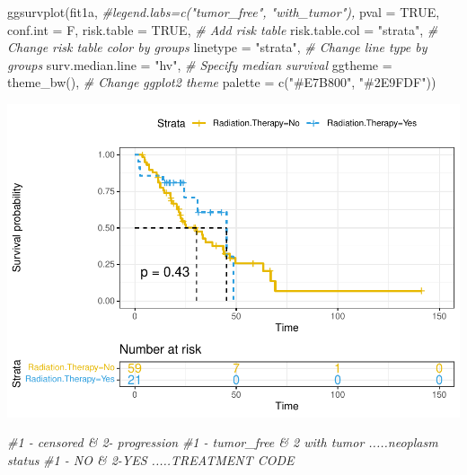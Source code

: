 \documentclass[
  11pt,
]{article}
\newenvironment{Shaded}{\begin{snugshade}}{\end{snugshade}}
\newcommand{\AttributeTok}[1]{\textcolor[rgb]{0.77,0.63,0.00}{#1}}
\newcommand{\CommentTok}[1]{\textcolor[rgb]{0.56,0.35,0.01}{\textit{#1}}}
\newcommand{\ConstantTok}[1]{\textcolor[rgb]{0.00,0.00,0.00}{#1}}
\newcommand{\FunctionTok}[1]{\textcolor[rgb]{0.00,0.00,0.00}{#1}}
\newcommand{\NormalTok}[1]{#1}
\newcommand{\StringTok}[1]{\textcolor[rgb]{0.31,0.60,0.02}{#1}}
\begin{document}
\begin{Shaded}
\begin{Highlighting}[]
\FunctionTok{ggsurvplot}\NormalTok{(fit1a,}
          \CommentTok{\#legend.labs=c("tumor\_free", "with\_tumor"),}
          \AttributeTok{pval =} \ConstantTok{TRUE}\NormalTok{, }\AttributeTok{conf.int =}\NormalTok{ F,}
          \AttributeTok{risk.table =} \ConstantTok{TRUE}\NormalTok{, }\CommentTok{\# Add risk table}
          \AttributeTok{risk.table.col =} \StringTok{"strata"}\NormalTok{, }\CommentTok{\# Change risk table color by groups}
          \AttributeTok{linetype =} \StringTok{"strata"}\NormalTok{, }\CommentTok{\# Change line type by groups}
          \AttributeTok{surv.median.line =} \StringTok{"hv"}\NormalTok{, }\CommentTok{\# Specify median survival}
          \AttributeTok{ggtheme =} \FunctionTok{theme\_bw}\NormalTok{(), }\CommentTok{\# Change ggplot2 theme}
          \AttributeTok{palette =} \FunctionTok{c}\NormalTok{(}\StringTok{"\#E7B800"}\NormalTok{, }\StringTok{"\#2E9FDF"}\NormalTok{))}
\end{Highlighting}
\end{Shaded}

\includegraphics{new_surv_2_files/figure-latex/unnamed-chunk-6-1.pdf}

\begin{Shaded}
\begin{Highlighting}[]
\CommentTok{\#1 {-} censored \& 2{-} progression}
\CommentTok{\#1 {-} tumor\_free \& 2 with tumor .....neoplasm status }
\CommentTok{\#1 {-} NO \& 2{-}YES .....TREATMENT CODE}
\end{Highlighting}
\end{Shaded}
\end{document}

